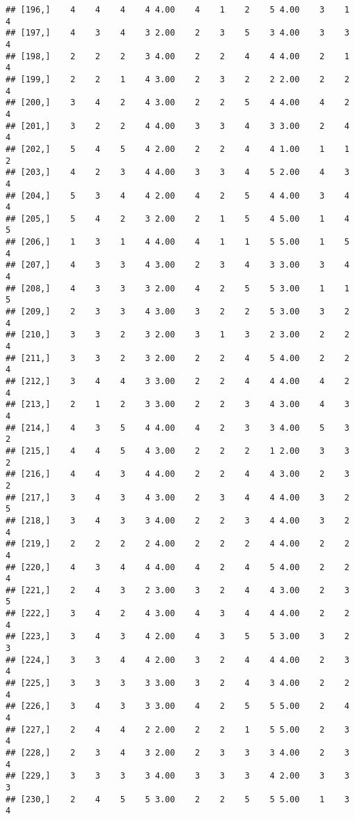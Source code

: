 \documentclass[]{article}
\begin{document}
\begin{verbatim}
## [196,]    4    4    4    4 4.00    4    1    2    5 4.00    3    1    4
## [197,]    4    3    4    3 2.00    2    3    5    3 4.00    3    3    4
## [198,]    2    2    2    3 4.00    2    2    4    4 4.00    2    1    4
## [199,]    2    2    1    4 3.00    2    3    2    2 2.00    2    2    4
## [200,]    3    4    2    4 3.00    2    2    5    4 4.00    4    2    4
## [201,]    3    2    2    4 4.00    3    3    4    3 3.00    2    4    4
## [202,]    5    4    5    4 2.00    2    2    4    4 1.00    1    1    2
## [203,]    4    2    3    4 4.00    3    3    4    5 2.00    4    3    4
## [204,]    5    3    4    4 2.00    4    2    5    4 4.00    3    4    4
## [205,]    5    4    2    3 2.00    2    1    5    4 5.00    1    4    5
## [206,]    1    3    1    4 4.00    4    1    1    5 5.00    1    5    4
## [207,]    4    3    3    4 3.00    2    3    4    3 3.00    3    4    4
## [208,]    4    3    3    3 2.00    4    2    5    5 3.00    1    1    5
## [209,]    2    3    3    4 3.00    3    2    2    5 3.00    3    2    4
## [210,]    3    3    2    3 2.00    3    1    3    2 3.00    2    2    4
## [211,]    3    3    2    3 2.00    2    2    4    5 4.00    2    2    4
## [212,]    3    4    4    3 3.00    2    2    4    4 4.00    4    2    4
## [213,]    2    1    2    3 3.00    2    2    3    4 3.00    4    3    4
## [214,]    4    3    5    4 4.00    4    2    3    3 4.00    5    3    2
## [215,]    4    4    5    4 3.00    2    2    2    1 2.00    3    3    2
## [216,]    4    4    3    4 4.00    2    2    4    4 3.00    2    3    2
## [217,]    3    4    3    4 3.00    2    3    4    4 4.00    3    2    5
## [218,]    3    4    3    3 4.00    2    2    3    4 4.00    3    2    4
## [219,]    2    2    2    2 4.00    2    2    2    4 4.00    2    2    4
## [220,]    4    3    4    4 4.00    4    2    4    5 4.00    2    2    4
## [221,]    2    4    3    2 3.00    3    2    4    4 3.00    2    3    5
## [222,]    3    4    2    4 3.00    4    3    4    4 4.00    2    2    4
## [223,]    3    4    3    4 2.00    4    3    5    5 3.00    3    2    3
## [224,]    3    3    4    4 2.00    3    2    4    4 4.00    2    3    4
## [225,]    3    3    3    3 3.00    3    2    4    3 4.00    2    2    4
## [226,]    3    4    3    3 3.00    4    2    5    5 5.00    2    4    4
## [227,]    2    4    4    2 2.00    2    2    1    5 5.00    2    3    4
## [228,]    2    3    4    3 2.00    2    3    3    3 4.00    2    3    4
## [229,]    3    3    3    3 4.00    3    3    3    4 2.00    3    3    3
## [230,]    2    4    5    5 3.00    2    2    5    5 5.00    1    3    4

\end{verbatim}
\end{document}
